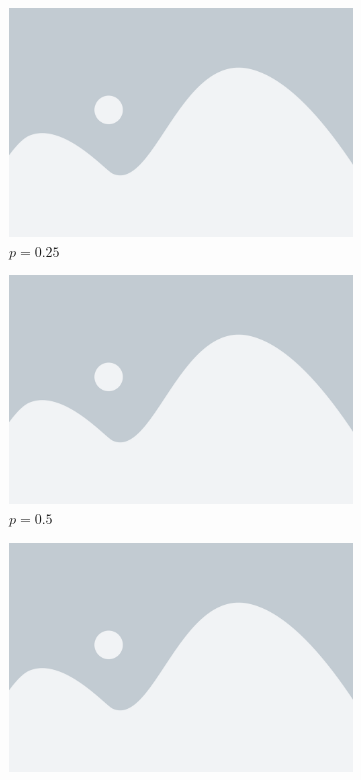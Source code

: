 \begin{figure}[h!]
  \begin{subfigure}[b]{0.3\textwidth}
    \centering
    \includegraphics[width=\textwidth]{placeholder}
    \caption{$p=0.25$}
    \label{fig:p=0.25}
  \end{subfigure}
  \hfill
  \begin{subfigure}[b]{0.3\textwidth}
    \centering
    \includegraphics[width=\textwidth]{placeholder}
    \caption{$p=0.5$}
    \label{fig:p=0.5}
  \end{subfigure}
  \hfill
  \begin{subfigure}[b]{0.3\textwidth}
    \centering
    \includegraphics[width=\textwidth]{placeholder}

\end{subfigure}
\end{figure}
